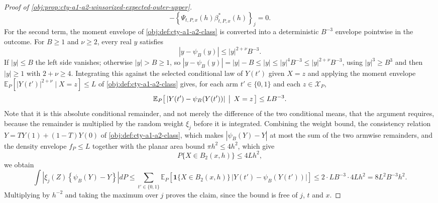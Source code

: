 \begin{proof}[Proof of \cref{obj:prop:cty-a1-a2-winsorized-expected-outer-upper}]
\[-
\left\{\Psi_{t,P,x}(h)\beta^*_{t,P,x}(h)\right\}_j
=
0 .
\]
For the second term, the moment envelope of \cref{obj:def:cty-a1-a2-class} is converted into a deterministic \(B^{-3}\) envelope pointwise in the outcome.  For \(B\geq1\) and \(\nu\geq2\), every real \(y\) satisfies
\[
|y-\psi_B(y)|\leq|y|^{2+\nu}B^{-3} .
\]
If \(|y|\leq B\) the left side vanishes; otherwise \(|y|>B\geq1\), so \(|y-\psi_B(y)|=|y|-B\leq|y|\leq|y|^4B^{-3}\leq|y|^{2+\nu}B^{-3}\), using \(|y|^3\geq B^3\) and then \(|y|\geq1\) with \(2+\nu\geq4\).
Integrating this against the selected conditional law of \(Y(t')\) given \(X=z\) and applying the moment envelope \(\mathbb E_P[|Y(t')|^{2+\nu}\mid X=z]\leq L\) of \cref{obj:def:cty-a1-a2-class} gives, for each arm \(t'\in\{0,1\}\) and each \(z\in\mathcal X_P\),
\[
\mathbb E_P\bigl[\,|Y(t')-\psi_B(Y(t'))|\,\bigm|\,X=z\,\bigr]\leq LB^{-3} .
\]
Note that it is this absolute conditional remainder, and not merely the difference of the two conditional means, that the argument requires, because the remainder is multiplied by the random weight \(\xi_j\) before it is integrated.
Combining the weight bound, the consistency relation \(Y=TY(1)+(1-T)Y(0)\) of \cref{obj:def:cty-a1-a2-class}, which makes \(|\psi_B(Y)-Y|\) at most the sum of the two armwise remainders, and the density envelope \(f_P\leq L\) together with the planar area bound \(\pi h^2\leq4h^2\), which give
\[
P\{X\in B_2(x,h)\}\leq4Lh^2 ,
\]
we obtain
\[
\int\left|\xi_j(Z)\left\{\psi_B(Y)-Y\right\}\right|dP
\leq
\sum_{t'\in\{0,1\}}
\mathbb E_P\!\left[\mathbf 1\{X\in B_2(x,h)\}\,\bigl|Y(t')-\psi_B(Y(t'))\bigr|\right]
\leq
2\cdot LB^{-3}\cdot4Lh^2
=
8L^2B^{-3}h^2 .
\]
Multiplying by \(h^{-2}\) and taking the maximum over \(j\) proves the claim, since the bound is free of \(j\), \(t\) and \(x\).


\end{proof}
